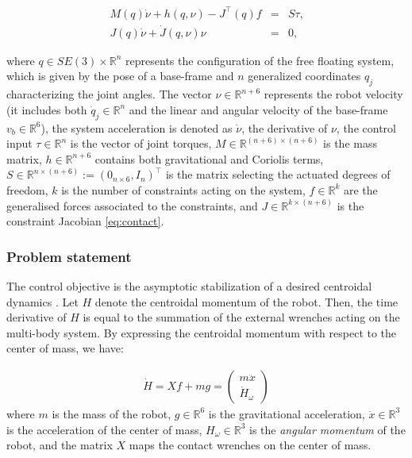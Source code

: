 \documentclass[final,5p,twocolumn]{elsarticle}
\newcommand{\Rv}[1]{{\mathbb{R}^{#1}}}				%
\newcommand{\R}[2]{{\mathbb{R}^{#1\times #2}}}		%
\begin{document}
\begin{eqnarray}\label{eq:dyn}
\label{eq:dynNoContacts}
M(q) \dot{\nu} + h(q, \nu) - J^\top(q) f  &=&
{S} \tau \mbox{,}\\
\label{eq:contact}
 J(q) \dot{\nu} + \dot{J}(q, \nu) \nu &=& 0 \mbox{,}
 \end{eqnarray}

\noindent
where $q \in SE(3) \times \Rv{n}$ represents the configuration of the free floating system,
 which is given by the
pose of a base-frame and $n$ generalized coordinates $q_j$ characterizing the joint angles.
The vector $\nu \in \Rv{n+6}$ represents the robot velocity
(it includes both $\dot{q}_j \in \Rv{n}$ and the linear and angular velocity of the base-frame $v_b \in \Rv{6}$), the system acceleration is denoted as $\dot \nu$,
the derivative of $\nu$, the control input
$\tau \in \Rv{n}$ is the vector of joint torques, $M \in \R{(n+6)}{(n+6)}$ is the mass matrix, $h \in \Rv{n+6}$ contains both
gravitational and Coriolis terms, $S \in \R{n}{(n+6)} := (0_{n\times 6}, I_n)^\top$ is the matrix selecting the actuated degrees of freedom, $k$ is the number of constraints acting on the system, $f \in \Rv{k}$ are the generalised forces associated to the constraints, and $J \in \R{k}{(n+6)}$ is the constraint Jacobian \eqref{eq:contact}.


\subsubsection{Problem statement}

The control objective is the asymptotic stabilization of a desired centroidal dynamics \cite{Orin2013}. Let $H$
denote the centroidal momentum of the robot. Then, the time derivative of $H$ is equal to the summation of the external wrenches acting on the multi-body system. By expressing the centroidal momentum with respect to the center of mass, we have:

\begin{eqnarray} 
    {\dot H}  =   X f + mg 
     = \begin{pmatrix} m \ddot{x} \\ \dot{H}_\omega  \end{pmatrix} \label{eq:constraintsSi}
\end{eqnarray}
where $m$ is the mass of the robot, $g \in \mathbb{R}^6$ is the gravitational acceleration, $\ddot{x} \in \mathbb{R}^3 $ 
is the acceleration of the center of mass, $H_\omega \in \mathbb{R}^3$ is the \emph{angular momentum} of the robot, and the matrix $X$ maps the contact wrenches on the center of mass.
\end{document}
